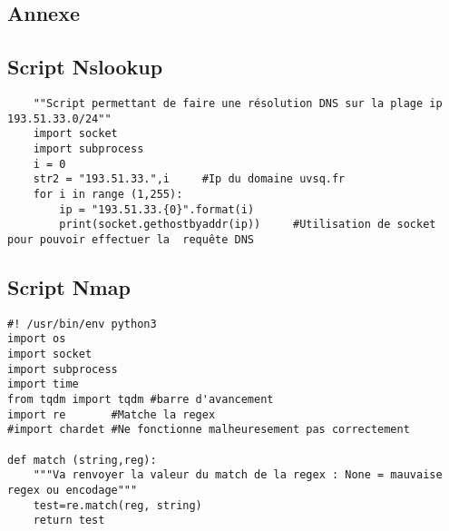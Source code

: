 \begin{appendix}
    \chapter{Annexe}
    
    \section*{Script Nslookup}

    \setlstipython
    \begin{lstlisting}
    ""Script permettant de faire une résolution DNS sur la plage ip 193.51.33.0/24""
    import socket
    import subprocess
    i = 0
    str2 = "193.51.33.",i     #Ip du domaine uvsq.fr
    for i in range (1,255):
        ip = "193.51.33.{0}".format(i)
        print(socket.gethostbyaddr(ip))     #Utilisation de socket pour pouvoir effectuer la  requête DNS
    \end{lstlisting}
    \label{fig:nslookup}
    
    \section*{Script Nmap}
    
    \begin{lstlisting}
#! /usr/bin/env python3
import os
import socket
import subprocess
import time
from tqdm import tqdm #barre d'avancement
import re		#Matche la regex
#import chardet #Ne fonctionne malheuresement pas correctement

def match (string,reg):
	"""Va renvoyer la valeur du match de la regex : None = mauvaise regex ou encodage"""
	test=re.match(reg, string)
	return test


\end{lstlisting}
\end{appendix}
